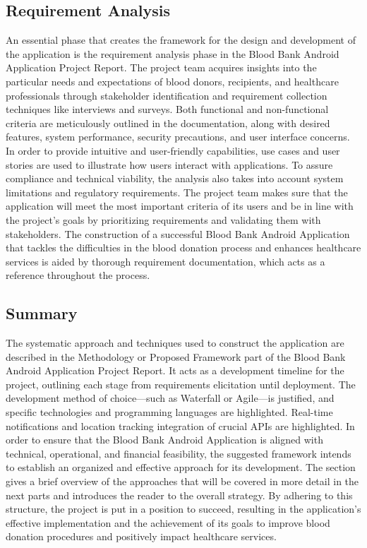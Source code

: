 \subsection{Requirement Analysis}
An essential phase that creates the framework for the design and development of the application
is the requirement analysis phase in the Blood Bank Android Application Project Report. The 
project team acquires insights into the particular needs and expectations of blood donors,
recipients, and healthcare professionals through stakeholder identification and requirement
collection techniques like interviews and surveys. Both functional and non-functional criteria are
meticulously outlined in the documentation, along with desired features, system performance,
security precautions, and user interface concerns. In order to provide intuitive and user-friendly
capabilities, use cases and user stories are used to illustrate how users interact with applications.
To assure compliance and technical viability, the analysis also takes into account system
limitations and regulatory requirements. The project team makes sure that the application will
meet the most important criteria of its users and be in line with the project's goals by prioritizing
requirements and validating them with stakeholders. The construction of a successful Blood Bank
Android Application that tackles the difficulties in the blood donation process and enhances
healthcare services is aided by thorough requirement documentation, which acts as a reference
throughout the process.
\subsection{Summary}
The systematic approach and techniques used to construct the application are described in the
Methodology or Proposed Framework part of the Blood Bank Android Application Project Report.
It acts as a development timeline for the project, outlining each stage from requirements
elicitation until deployment. The development method of choice—such as Waterfall or Agile—is
justified, and specific technologies and programming languages are highlighted. Real-time
notifications and location tracking integration of crucial APIs are highlighted.
In order to ensure that the Blood Bank Android Application is aligned with technical, operational,
and financial feasibility, the suggested framework intends to establish an organized and effective
approach for its development. The section gives a brief overview of the approaches that will be
covered in more detail in the next parts and introduces the reader to the overall strategy. By
adhering to this structure, the project is put in a position to succeed, resulting in the application's
effective implementation and the achievement of its goals to improve blood donation
procedures and positively impact healthcare services.